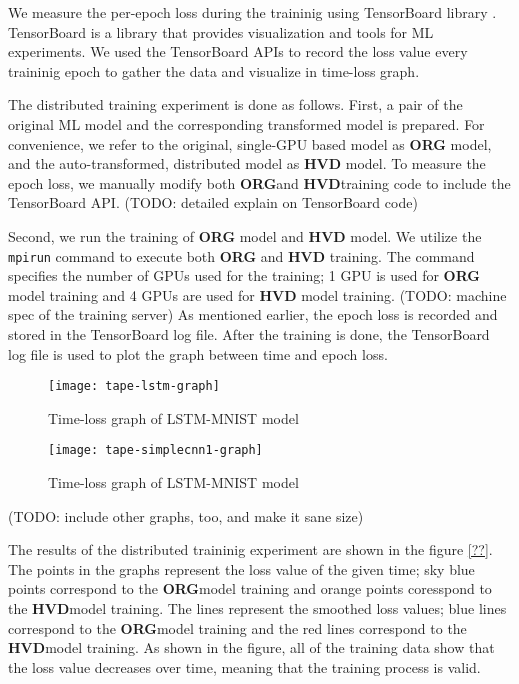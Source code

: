 We measure the per-epoch loss during the traininig using
TensorBoard library \cite{tensorboard}. 
TensorBoard is a library that provides visualization and tools
for ML experiments.
We used the TensorBoard APIs to record the loss value every traininig epoch
to gather the data and visualize in time-loss graph.

\newcommand{\orgbf}{\textbf{ORG}}
\newcommand{\hvdbf}{\textbf{HVD}}

The distributed training experiment is done as follows.
First, a pair of the original ML model and the corresponding transformed model
is prepared. For convenience, we refer to the original, single-GPU based model
as \textbf{ORG} model, and the auto-transformed, distributed model as
\textbf{HVD} model. To measure the epoch loss, we manually modify both  
\orgbf and \hvdbf training code to include the TensorBoard API. 
(TODO: detailed explain on TensorBoard code)

Second, we run the training of \textbf{ORG} model and
\textbf{HVD} model. We utilize the {\tt mpirun} command to execute both
\textbf{ORG} and \textbf{HVD} training. The command specifies the number of
GPUs used for the training; 1 GPU is used for \textbf{ORG} model training  
and 4 GPUs are used for \textbf{HVD} model training. 
(TODO: machine spec of the training server)
As mentioned earlier, the epoch loss is recorded and stored in the
TensorBoard log file.
After the training is done, the TensorBoard log file is used to plot the
graph between time and epoch loss. 

\begin{figure}[!ht]
  \texttt{[image: tape-lstm-graph]}
  \caption{Time-loss graph of LSTM-MNIST model}
\end{figure}

\begin{figure}[!ht]
  \texttt{[image: tape-simplecnn1-graph]}
  \caption{Time-loss graph of LSTM-MNIST model}
\end{figure}

(TODO: include other graphs, too, and make it sane size)

The results of the distributed traininig experiment 
are shown in the figure \ref{??}.
The points in the graphs represent the loss value of the given time;
sky blue points correspond to the \orgbf model training and
orange points coresspond to the \hvdbf model training.
The lines represent the smoothed loss values;
blue lines correspond to the \orgbf model training
and the red lines correspond to the \hvdbf model training.
As shown in the figure, all of the training data show that
the loss value decreases over time, meaning that the training
process is valid.

